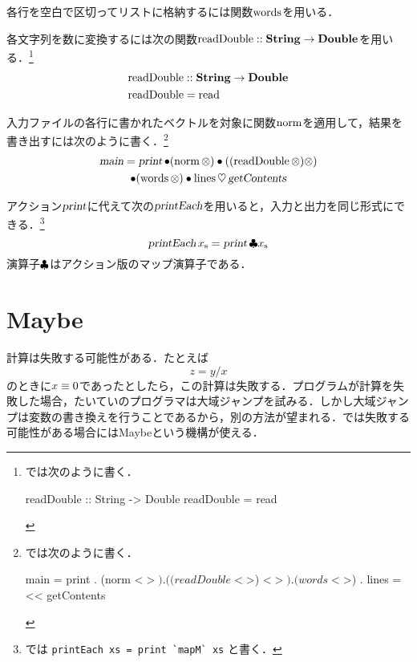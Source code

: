 \documentclass[platex,a5paper,twoside,fleqn,draft]{jsbook}
\begin{document}
各行を空白で区切ってリストに格納するには関数$\mathop{\textrm{words}}$を用いる．

各文字列を数に変換するには次の関数$\mathop{\textrm{readDouble}}::\mathord{\mathbf{String}}\rightarrow\mathord{\mathbf{Double}}$を用いる．\footnote{\haskell では次のように書く．
\begin{footcode}
      readDouble :: String -> Double
      readDouble = read
\end{footcode}}
\begin{align}
\mathop{\textrm{readDouble}}&::\mathord{\mathbf{String}}\rightarrow\mathord{\mathbf{Double}}\\
\mathop{\textrm{readDouble}}&=\mathop{\textrm{read}}
\end{align}

入力ファイルの各行に書かれたベクトルを対象に関数$\mathop{\textrm{norm}}$を適用して，結果を書き出すには次のように書く．\footnote{\haskell では次のように書く．
\begin{footcode}
      main = print 
        . (norm <$>) 
        . ((readDouble <$>) <$>) 
        . (words <$>) 
        . lines 
        =<< getContents
\end{footcode}}
\begin{multline}
\mathop{\textsl{main}}=\mathop{\textsl{print}}
\mathbin{\bullet}(\mathop{\textrm{norm}}\otimes)
\mathbin{\bullet}((\mathop{\textrm{readDouble}}\otimes)\otimes)\\
\mathbin{\bullet}(\mathop{\textrm{words}}\otimes)
\mathbin{\bullet}\mathop{\textrm{lines}}
\mathbin{\heartsuit}\mathop{\textsl{getContents}}
\end{multline}

アクション$\mathop{\textsl{print}}$に代えて次の$\mathop{\textsl{printEach}}$を用いると，入力と出力を同じ形式にできる．\footnote{\haskell では \verb|printEach xs = print `mapM` xs| と書く．}
\begin{equation}
\mathop{\textsl{printEach}}{x}_\mathrm{s}=\mathop{\textsl{print}}\mathbin{\clubsuit}{x}_\mathrm{s}
\end{equation}
演算子$\mathbin{\clubsuit}$はアクション版のマップ演算子である．

\section{Maybe}

計算は失敗する可能性がある．たとえば
\begin{equation}
z=y/x
\end{equation}
のときに$x\equiv0$であったとしたら，この計算は失敗する．プログラムが計算を失敗した場合，たいていのプログラマは大域ジャンプを試みる．しかし大域ジャンプは変数の書き換えを行うことであるから，別の方法が望まれる．\haskell では失敗する可能性がある場合にはMaybeという機構が使える．
\end{document}
